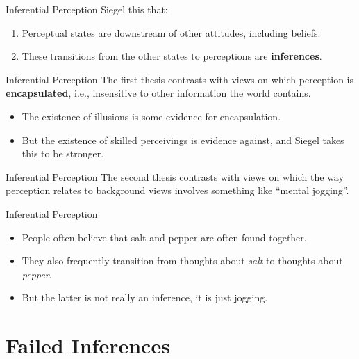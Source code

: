 \documentclass[
  17pt,
  letterpaper,
  ignorenonframetext,
  aspectratio=169,
  handout,
  xcolor={dvipsnames}]{beamer}
\providecommand{\tightlist}{%
  \setlength{\itemsep}{0pt}\setlength{\parskip}{0pt}}\usepackage{longtable,booktabs,array}
\begin{document}
\begin{frame}{Inferential Perception}
\protect\hypertarget{inferential-perception}{}
Siegel this that:

\begin{enumerate}[<+->]
\tightlist
\item
  Perceptual states are downstream of other attitudes, including
  beliefs.
\item
  These transitions from the other states to perceptions are
  \textbf{inferences}.
\end{enumerate}
\end{frame}

\begin{frame}{Inferential Perception}
\protect\hypertarget{inferential-perception-1}{}
The first thesis contrasts with views on which perception is
\textbf{encapsulated}, i.e., insensitive to other information the world
contains.

\begin{itemize}[<+->]
\tightlist
\item
  The existence of illusions is some evidence for encapsulation.
\item
  But the existence of skilled perceivings is evidence against, and
  Siegel takes this to be stronger.
\end{itemize}
\end{frame}

\begin{frame}{Inferential Perception}
\protect\hypertarget{inferential-perception-2}{}
The second thesis contrasts with views on which the way perception
relates to background views involves something like ``mental jogging''.
\end{frame}

\begin{frame}{Inferential Perception}
\protect\hypertarget{inferential-perception-3}{}
\begin{itemize}[<+->]
\tightlist
\item
  People often believe that salt and pepper are often found together.
\item
  They also frequently transition from thoughts about \emph{salt} to
  thoughts about \emph{pepper}.
\item
  But the latter is not really an inference, it is just jogging.
\end{itemize}
\end{frame}

\hypertarget{failed-inferences}{%
\section{Failed Inferences}\label{failed-inferences}}
\end{document}
